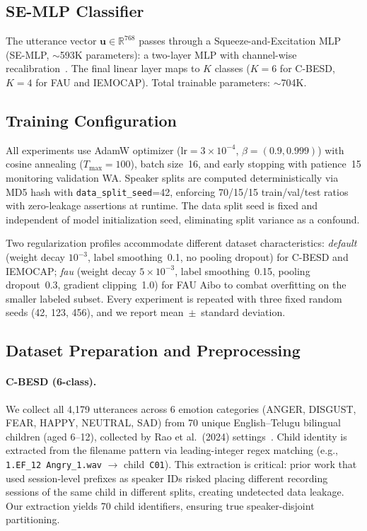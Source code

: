 \documentclass[11pt,a4paper]{article}
\begin{document}
\subsection{SE-MLP Classifier}
\label{ssec:classifier}

The utterance vector $\mathbf{u} \in \mathbb{R}^{768}$ passes through a
Squeeze-and-Excitation MLP (SE-MLP, $\sim$593K parameters): a two-layer MLP
with channel-wise recalibration~\cite{hu2018senet}. The final linear layer maps
to $K$ classes ($K=6$ for C-BESD, $K=4$ for FAU and IEMOCAP). Total trainable
parameters: $\sim$704K.

\subsection{Training Configuration}
\label{ssec:training}

All experiments use AdamW optimizer ($\text{lr}=3\times 10^{-4}$,
$\beta=(0.9,0.999)$) with cosine annealing ($T_{\text{max}}=100$), batch
size~16, and early stopping with patience~15 monitoring validation WA.
Speaker splits are computed deterministically via MD5 hash with
\texttt{data\_split\_seed}=42, enforcing 70/15/15 train/val/test ratios with
zero-leakage assertions at runtime. The data split seed is fixed and
independent of model initialization seed, eliminating split variance as a
confound.

Two regularization profiles accommodate different dataset characteristics:
\textit{default} (weight decay $10^{-3}$, label smoothing~0.1, no pooling
dropout) for C-BESD and IEMOCAP; \textit{fau} (weight decay $5\times 10^{-3}$,
label smoothing~0.15, pooling dropout~0.3, gradient clipping~1.0) for FAU Aibo
to combat overfitting on the smaller labeled subset. Every experiment is
repeated with three fixed random seeds (42, 123, 456), and we report
mean~$\pm$~standard deviation.

\subsection{Dataset Preparation and Preprocessing}
\label{ssec:datasets}

\paragraph{C-BESD (6-class).} We collect all 4,179 utterances across 6 emotion
categories (ANGER, DISGUST, FEAR, HAPPY, NEUTRAL, SAD) from 70 unique English--Telugu bilingual
children (aged 6--12), collected by Rao et al.\ (2024)
settings~\cite{sazali2023besd,rao2024cbesd}. Child identity
is extracted from the filename pattern via leading-integer regex matching (e.g.,
\texttt{1.EF\_12 Angry\_1.wav} $\rightarrow$ child~\texttt{C01}). This
extraction is critical: prior work that used session-level prefixes as speaker
IDs risked placing different recording sessions of the same child in different
splits, creating undetected data leakage. Our extraction yields 70 child
identifiers, ensuring true speaker-disjoint partitioning.
\end{document}
